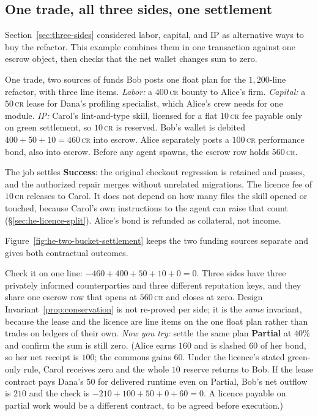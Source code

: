 \documentclass[11pt,a4paper]{article}
\theoremstyle{definition}
\theoremstyle{definition}
\theoremstyle{remark}
\begin{document}
\subsection{One trade, all three sides, one settlement}\label{sec:one-settlement}

Section~\ref{sec:three-sides} considered labor, capital, and IP as alternative
ways to buy the refactor. This example combines them in one transaction against
one escrow object, then checks that the net wallet changes sum to zero.

\begin{pdexample}{One trade, two sources of funds}
Bob posts one float plan for
the $1{,}200$-line refactor, with three line items. \emph{Labor:} a $400$\,\textsc{cr}
bounty to Alice's firm. \emph{Capital:} a $50$\,\textsc{cr} lease for Dana's
profiling specialist, which Alice's crew needs for one module. \emph{IP:} Carol's
lint-and-type skill, licensed for a flat $10$\,\textsc{cr} fee payable only on
green settlement, so $10$\,\textsc{cr} is reserved. Bob's wallet is debited
$400+50+10 = 460$\,\textsc{cr} into escrow. Alice separately posts a
$100$\,\textsc{cr} performance bond, also into escrow. Before any agent spawns, the
escrow row holds $560$\,\textsc{cr}.

The job settles \textbf{Success}: the original checkout regression is retained
and passes, and the authorized repair merges without unrelated migrations. The
licence fee of $10$\,\textsc{cr} releases to Carol. It does not depend on how
many files the skill opened or touched, because Carol's own instructions to
the agent can raise that count (\S\ref{sec:he-licence-split}). Alice's bond is
refunded as collateral, not income.
\end{pdexample}

Figure~\ref{fig:he-two-bucket-settlement} keeps the two funding sources separate
and gives both contractual outcomes.



\noindent Check it on one line: $-460 + 400 + 50 + 10 + 0 = 0$. Three sides have
three privately informed counterparties and three different reputation keys,
and they share one escrow row that opens at $560$\,\textsc{cr} and closes at zero.
Design Invariant~\ref{prop:conservation} is not re-proved per side; it is the \emph{same}
invariant, because the lease and the licence are line items on the one float plan
rather than trades on ledgers of their own. \emph{Now you try:} settle the same plan
\textbf{Partial} at $40\%$ and confirm the sum is still zero. (Alice earns $160$ and
is slashed $60$ of her bond, so her net receipt is $100$; the commons gains
$60$. Under the licence's stated green-only rule, Carol receives zero and the
whole $10$ reserve returns to Bob. If the lease contract pays Dana's $50$
for delivered runtime even on Partial, Bob's net outflow is $210$ and the check
is $-210+100+50+0+60=0$. A licence payable on partial work would be a different
contract, to be agreed before execution.)
\end{document}
